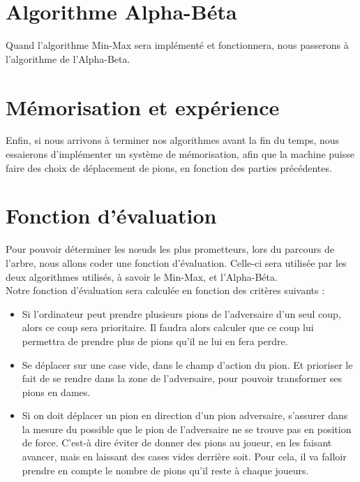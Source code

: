 \documentclass[a4paper, title page, 12pt]{report}
\begin{document}
	\section{Algorithme Alpha-Béta}
	Quand l'algorithme Min-Max sera implémenté et fonctionnera, nous passerons à l'algorithme de l'Alpha-Beta.\\
	
	\section{Mémorisation et expérience}
	Enfin, si nous arrivons à terminer nos algorithmes avant la fin du temps, nous essaierons d'implémenter un système de mémorisation, afin que la machine puisse faire des choix de déplacement de pions, en fonction des parties précédentes.
	
	\section{Fonction d'évaluation}
	Pour pouvoir déterminer les nœuds les plus prometteurs, lors du parcours de l'arbre, nous allons coder une fonction d'évaluation. Celle-ci sera utilisée par les deux algorithmes utilisés, à savoir le Min-Max, et l'Alpha-Béta.\\
	
	Notre fonction d'évaluation sera calculée en fonction des critères suivants : 
 
	\begin{itemize}
		\item Si l'ordinateur peut prendre plusieurs pions de l'adversaire d'un seul coup, alors ce coup sera prioritaire. Il faudra alors calculer que ce coup lui permettra de prendre plus de pions qu'il ne lui en fera perdre.
		
		\item Se déplacer sur une case vide, dans le champ d'action du pion. Et prioriser le fait de se rendre dans la zone de l'adversaire, pour pouvoir transformer ses pions en dames. 
		
		\item Si on doit déplacer un pion en direction d'un pion adversaire, s'assurer dans la mesure du possible que le pion de l'adversaire ne se trouve pas en position de force. C'est-à dire éviter de donner des pions au joueur, en les faisant avancer, mais en laissant des cases vides derrière soit. Pour cela, il va falloir prendre en compte le nombre de pions qu'il reste à chaque joueurs.\\
\end{itemize}
\end{document}
